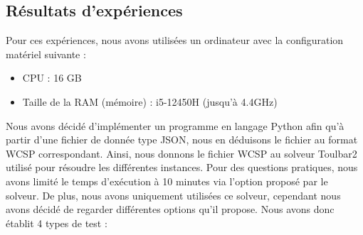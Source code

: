 \documentclass[a4paper, 10pt]{article}
\begin{document}
    \subsection{Résultats d'expériences}
      Pour ces expériences, nous avons utilisées un ordinateur avec la configuration matériel suivante :
      \begin{itemize}
        \item CPU : 16 GB
        \item Taille de la RAM (mémoire) : i5-12450H  (jusqu'à 4.4GHz)
      \end{itemize}

      Nous avons décidé d'implémenter un programme en langage Python afin qu'à partir d'une fichier de donnée type JSON, nous en déduisons le fichier au format WCSP correspondant. Ainsi, nous donnons le fichier WCSP au solveur Toulbar2 utilisé pour résoudre les différentes instances. Pour des questions pratiques, nous avons limité le temps d'exécution à 10 minutes via l'option proposé par le solveur. De plus, nous avons uniquement utilisées ce solveur, cependant nous avons décidé de regarder différentes options qu'il propose. Nous avons donc établit 4 types de test :
\end{document}
